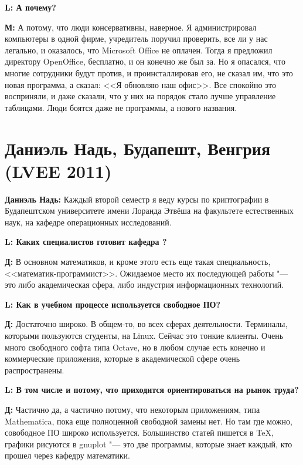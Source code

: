 \documentclass[10pt, a5paper]{article}
\begin{document}
{\noindent \bf L: А почему?}

{\noindent \bf М:} А потому, что люди консервативны, наверное. Я администрировал компьютеры в одной фирме, учредитель поручил проверить, все ли у нас легально, и оказалось, что Microsoft Office не оплачен. Тогда я предложил директору OpenOffice, бесплатно, и он конечно же был за. Но я опасался, что многие сотрудники будут против, и проинсталлировав его, не сказал им, что это новая программа, а сказал: <<Я обновляю наш офис>>. Все спокойно это восприняли, и даже сказали, что у них на порядок стало лучше управление таблицами. Люди боятся даже не программы, а нового названия.

\section[Даниэль Надь, Будапешт, Венгрия (LVEE 2011)]{Даниэль Надь, Будапешт, Венгрия \linebreak (LVEE 2011)}


{\noindent \bf Даниэль Надь:} Каждый второй семестр я веду курсы по криптографии в Будапештском университете имени Лоранда Этвёша на факультете естественных наук, на кафедре операционных исследований.

{\noindent \bf L: Каких специалистов готовит кафедра ?}

{\noindent \bf Д:} В основном математиков, и кроме этого есть еще такая специальность, <<математик-программист>>. Ожидаемое место их последующей работы "--- это либо академическая сфера, либо индустрия информационных технологий.

{\noindent \bf L:  Как в учебном процессе используется свободное ПО?}

{\noindent \bf Д:} Достаточно широко. В общем-то, во всех сферах деятельности. Терминалы, которыми пользуются студенты, на Linux. Сейчас это тонкие клиенты. Очень много свободного софта типа Octave, но в любом случае есть конечно и коммерческие приложения, которые в академической сфере очень распространены. 

{\noindent \bf L: В том числе и потому, что приходится ориентироваться на рынок труда?}

{\noindent \bf Д:} Частично да, а частично потому, что некоторым приложениям, типа Mathematica, пока еще полноценной свободной замены нет. Но там где можно, совободное ПО широко используется. Большинство статей пишется в \TeX, графики рисуются в gnuplot "--- это две программы, которые знает каждый, кто прошел через кафедру математики.  
\end{document}
